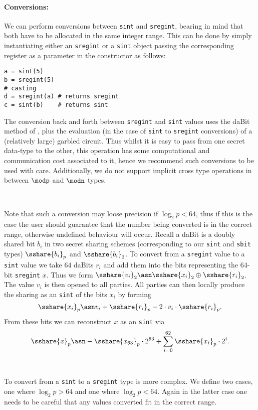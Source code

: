 \paragraph{Conversions:} We can perform conversions between \verb|sint| and \verb|sregint|, bearing in mind that both have to be allocated in the same integer range. This can be done by simply instantiating either an \verb|sregint| or a
\verb|sint| object passing the corresponding register as a parameter in the constructor as follows: 
\begin{lstlisting}
a = sint(5)
b = sregint(5)
# casting
d = sregint(a) # returns sregint
c = sint(b)    # returns sint
\end{lstlisting}
The conversion back and forth between \verb|sregint| and \verb|sint| values uses the
daBit method of \cite{daBitPaper}, plus the evaluation (in the case of \verb|sint| to 
\verb|sregint| conversions) of a (relatively large) garbled circuit.
Thus whilst it is easy to pass from one secret data-type to the other, 
this operation has some computational and communication cost associated to it, hence 
we recommend such conversions to be used with care. 
Additionally, we do not support implicit cross type operations in between 
$\modp$ and $\modn$ types.

~

Note that such a conversion may loose precision if 
$\log_2 p < 64$, thus if this is the case the user should guarantee
that the number being converted is in the correct range, otherwise
undefined behaviour will occur.
Recall a daBit is a doubly shared bit $b_i$ in two secret sharing
schemes (corresponding to our \verb|sint| and \verb|sbit| types)
$\sshare{b_i}_p$ and $\sshare{b_i}_2$.
To convert from a \verb|sregint| value to a \verb|sint| value we take
$64$ daBits $r_i$ and add them into the bits representing the 64-bit
\verb|sregint| $x$.
Thus we form $\sshare{v_i}_2 \asn \sshare{x_i}_2 \oplus \sshare{r_i}_2$.
The value $v_i$ is then opened to all parties.
All parties can then locally produce the sharing as an \verb|sint|
of the bits $x_i$ by forming
\[  \sshare{x_i}_p \asn v_i + \sshare{r_i}_p - 2 \cdot v_i \cdot \sshare{r_i}_p. \]
From these bits we can reconstruct $x$ as an \verb|sint| via
\[ \sshare{x}_p \asn - \sshare{x_{63}}_p \cdot 2^{63} + \sum_{i=0}^{62} \sshare{x_i}_p \cdot 2^i. \]

~

To convert from a \verb|sint| to a \verb|sregint| type is more complex.
We define two cases, one where $\log_2 p > 64$ and one where $\log_2 p < 64$.
Again in the latter case one needs to be careful that any values converted
fit in the correct range.


